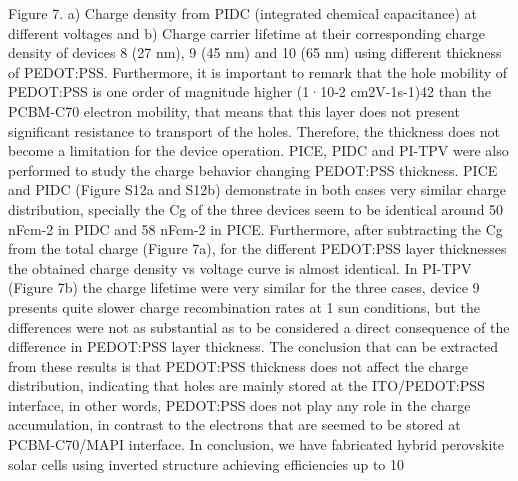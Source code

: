 Figure 7. a) Charge density from PIDC (integrated chemical capacitance) at different voltages and b) Charge carrier lifetime at their corresponding charge density of devices 8 (27 nm), 9 (45 nm) and 10 (65 nm) using different thickness of PEDOT:PSS.
Furthermore, it is important to remark that the hole mobility of PEDOT:PSS is one order of magnitude higher (1·10-2 cm2V-1s-1)42 than the PCBM-C70 electron mobility, that means that this layer does not present significant resistance to transport of the holes. 
Therefore, the thickness does not become a limitation for the device operation. PICE, PIDC and PI-TPV were also performed to study the charge behavior changing PEDOT:PSS thickness. PICE and PIDC (Figure S12a and S12b) demonstrate in both cases very similar charge distribution, specially the Cg of the three devices seem to be identical around 50 nFcm-2 in PIDC and 58 nFcm-2 in PICE.
Furthermore, after subtracting the Cg from the total charge (Figure 7a), for the different PEDOT:PSS layer thicknesses the obtained charge density vs voltage curve is almost identical. In PI-TPV (Figure 7b) the charge lifetime were very similar for the three cases, device 9 presents quite slower charge recombination rates at 1 sun conditions, but the differences were not as substantial as to be considered a direct consequence of the difference in PEDOT:PSS layer thickness. The conclusion that can be extracted from these results is that PEDOT:PSS thickness does not affect the charge distribution, indicating that holes are mainly stored at the ITO/PEDOT:PSS interface, in other words, PEDOT:PSS does not play any role in the charge accumulation, in contrast to the electrons that are seemed to be stored at PCBM-C70/MAPI interface.
In conclusion, we have fabricated hybrid perovskite solar cells using inverted structure achieving efficiencies up to 10 %
